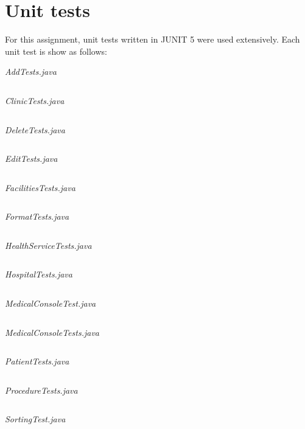 \documentclass{article}
\begin{document}
	\section{Unit tests}\label{sec:unit_tests} %
	For this assignment, unit tests written in JUNIT 5 \textcite{Junit5} were used extensively. Each unit test is show as follows:
	
	\textit{AddTests.java} 
	\inputminted{java}{src/test/java/com/yvesstraten/medicalconsole/tests/AddTests.java}

	\textit{ClinicTests.java} 
	\inputminted{java}{src/test/java/com/yvesstraten/medicalconsole/tests/ClinicTests.java}

	\textit{DeleteTests.java} 
	\inputminted{java}{src/test/java/com/yvesstraten/medicalconsole/tests/DeleteTests.java}

	\textit{EditTests.java} 
	\inputminted{java}{src/test/java/com/yvesstraten/medicalconsole/tests/EditTests.java}

	\textit{FacilitiesTests.java} 
	\inputminted{java}{src/test/java/com/yvesstraten/medicalconsole/tests/FacilitiesTests.java}

	\textit{FormatTests.java} 
	\inputminted{java}{src/test/java/com/yvesstraten/medicalconsole/tests/FormatTests.java}

	\textit{HealthServiceTests.java} 
	\inputminted{java}{src/test/java/com/yvesstraten/medicalconsole/tests/HealthServiceTests.java}

	\textit{HospitalTests.java} 
	\inputminted{java}{src/test/java/com/yvesstraten/medicalconsole/tests/HospitalTests.java}

	\textit{MedicalConsoleTest.java} 
	\inputminted{java}{src/test/java/com/yvesstraten/medicalconsole/tests/MedicalConsoleTest.java}

	\textit{MedicalConsoleTests.java} 
	\inputminted{java}{src/test/java/com/yvesstraten/medicalconsole/tests/MedicalConsoleTests.java}

	\textit{PatientTests.java} 
	\inputminted{java}{src/test/java/com/yvesstraten/medicalconsole/tests/PatientTests.java}

	\textit{ProcedureTests.java} 
	\inputminted{java}{src/test/java/com/yvesstraten/medicalconsole/tests/ProcedureTests.java}

	\textit{SortingTest.java} 
	\inputminted{java}{src/test/java/com/yvesstraten/medicalconsole/tests/SortingTest.java}
\end{document}
